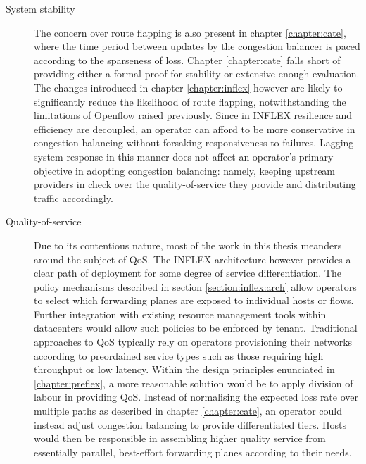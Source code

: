 \renewcommand{\descriptionlabel}[1]{\hspace{\labelsep}\textbf{#1.}}
\begin{description}
\item[System stability]{
The concern over route flapping is also present in chapter \ref{chapter:cate}, where the time period between updates by the congestion balancer is paced according to the sparseness of loss.
Chapter \ref{chapter:cate} falls short of providing either a formal proof for stability or extensive enough evaluation.
The changes introduced in chapter \ref{chapter:inflex} however are likely to significantly reduce the likelihood of route flapping, notwithstanding the limitations of Openflow raised previously.
Since in INFLEX resilience and efficiency are decoupled, an operator can afford to be more conservative in congestion balancing without forsaking responsiveness to failures.
Lagging system response in this manner does not affect an operator's primary objective in adopting congestion balancing: namely, keeping upstream providers in check over the quality-of-service they provide and distributing traffic accordingly.
}
\item[Quality-of-service]{
Due to its contentious nature, most of the work in this thesis meanders around the subject of \ac{QoS}.
The INFLEX architecture however provides a clear path of deployment for some degree of service differentiation.
The policy mechanisms described in section \ref{section:inflex:arch} allow operators to select which forwarding planes are exposed to individual hosts or flows.
Further integration with existing resource management tools within datacenters would allow such policies to be enforced by tenant.
Traditional approaches to \ac{QoS} typically rely on operators provisioning their networks according to preordained service types such as those requiring high throughput or low latency.
Within the design principles enunciated in \ref{chapter:preflex}, a more reasonable solution would be to apply division of labour in providing \ac{QoS}.
Instead of normalising the expected loss rate over multiple paths as described in chapter \ref{chapter:cate}, an operator could instead adjust congestion balancing to provide differentiated tiers.
Hosts would then be responsible in assembling higher quality service from essentially parallel, best-effort forwarding planes according to their needs.
}



\end{description}
